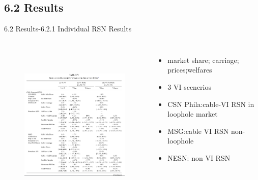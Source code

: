 \documentclass[10pt]{beamer}
\begin{document}
\subsection{6.2 Results}
\begin{frame}{6.2 Results-6.2.1 Individual RSN Results}
    \begin{columns}[c] 
    \column{9cm}
    \begin{figure}
        \centering
        \includegraphics[height=8cm]{table4-1}
    \end{figure}
    \column{4cm}
    \begin{itemize}
        \item market share; carriage; prices;welfares
        \item 3 VI scenerios
        \item CSN Phila:cable-VI RSN in loophole market
        \item MSG:cable VI RSN non-loophole
        \item NESN: non VI RSN
    \end{itemize}
	\end{columns}
\end{frame}
\end{document}
